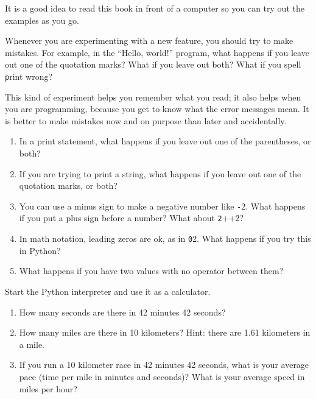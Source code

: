 \documentclass[
DIV=11,
fontsize=12,
twoside,
headinclude=false,
titlepage=firstiscover,
abstract=true,
headsepline=true,
footsepline=true,
chapterprefix=true, %
headings=big,
bibliography=totoc,%
captions=tableheading
]{scrbook}
\theoremstyle{definition}
\begin{document}
\begin{exercise}
\normalfont
\normalfont

It is a good idea to read this book in front of a computer so you can
try out the examples as you go.

Whenever you are experimenting with a new feature, you should try
to make mistakes.  For example, in the ``Hello, world!'' program,
what happens if you leave out one of the quotation marks?  What
if you leave out both?  What if you spell {\texttt print} wrong?

This kind of experiment helps you remember what you read; it also
helps when you are programming, because you get to know what the error
messages mean.  It is better to make mistakes now and on purpose than
later and accidentally.

\begin{enumerate}

\item In a print statement, what happens if you leave out one
of the parentheses, or both?

\item If you are trying to print a string, what happens if you
leave out one of the quotation marks, or both?

\item You can use a minus sign to make a negative number like
{\texttt -2}.  What happens if you put a plus sign before a number?
What about {\texttt 2++2}?

\item In math notation, leading zeros are ok, as in {\texttt 02}.
What happens if you try this in Python?

\item What happens if you have two values with no operator
between them?

\end{enumerate}

\end{exercise}



\begin{exercise}
\normalfont
\normalfont

Start the Python interpreter and use it as a calculator.

\begin{enumerate}

\item How many seconds are there in 42 minutes 42 seconds?

\item How many miles are there in 10 kilometers?  Hint: there are 1.61
  kilometers in a mile.

\item If you run a 10 kilometer race in 42 minutes 42 seconds, what is
  your average pace (time per mile in minutes and seconds)?  What is
  your average speed in miles per hour?


\end{enumerate}

\end{exercise}
\end{document}
